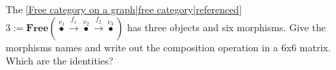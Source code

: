 
The \ref{Free category on a graph|free category|referenced} $3 := \mathbf{Free}(\boxed{\overset{v_1}\bullet \xrightarrow{f_1}\overset{v_2}{\bullet}\xrightarrow{f_2}\overset{v_3}{\bullet}})$ has three objects and six morphisms. Give the morphisms names and write out the composition operation in a 6x6 matrix. Which are the identities?